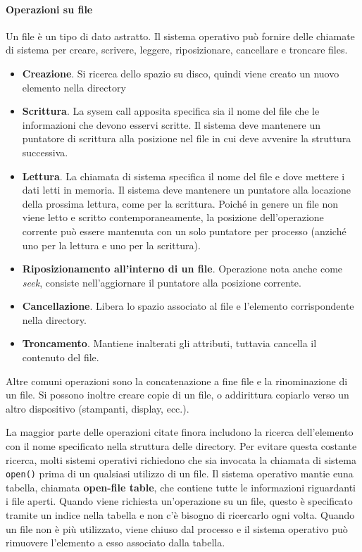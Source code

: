 \documentclass[a4paper]{article}
\begin{document}
\paragraph{Operazioni su file}
Un file è un tipo di dato astratto. Il sistema operativo può fornire delle chiamate di sistema per creare, scrivere, leggere, riposizionare, cancellare e troncare files.
\begin{itemize}
    \item \textbf{Creazione}. Si ricerca dello spazio su disco, quindi viene creato un nuovo elemento nella directory
    \item \textbf{Scrittura}. La sysem call apposita specifica sia il nome del file che le informazioni che devono esservi scritte. Il sistema deve mantenere un puntatore di scrittura alla posizione nel file in cui deve avvenire la struttura successiva.
    \item \textbf{Lettura}. La chiamata di sistema specifica il nome del file e dove mettere i dati letti in memoria. Il sistema deve mantenere un puntatore alla locazione della prossima lettura, come per la scrittura. Poiché in genere un file non viene letto e scritto contemporaneamente, la posizione dell'operazione corrente può essere mantenuta con un solo puntatore per processo (anziché uno per la lettura e uno per la scrittura).
    \item \textbf{Riposizionamento all'interno di un file}. Operazione nota anche come \textit{seek}, consiste nell'aggiornare il puntatore alla posizione corrente.
    \item \textbf{Cancellazione}. Libera lo spazio associato al file e l'elemento corrispondente nella directory.
    \item \textbf{Troncamento}. Mantiene inalterati gli attributi, tuttavia cancella il contenuto del file.
\end{itemize}

Altre comuni operazioni sono la concatenazione a fine file e la rinominazione di un file. Si possono inoltre creare copie di un file, o addirittura copiarlo verso un altro dispositivo (stampanti, display, ecc.).

La maggior parte delle operazioni citate finora includono la ricerca dell'elemento con il nome specificato nella struttura delle directory. Per evitare questa costante ricerca, molti sistemi operativi richiedono che sia invocata la chiamata di sistema \texttt{open()} prima di un qualsiasi utilizzo di un file. Il sistema operativo mantie euna tabella, chiamata \textbf{open-file table}, che contiene tutte le informazioni riguardanti i file aperti. Quando viene richiesta un'operazione su un file, questo è specificato tramite un indice nella tabella e non c'è bisogno di ricercarlo ogni volta. Quando un file non è più utilizzato, viene chiuso dal processo e il sistema operativo può rimuovere l'elemento a esso associato dalla tabella.
\end{document}
